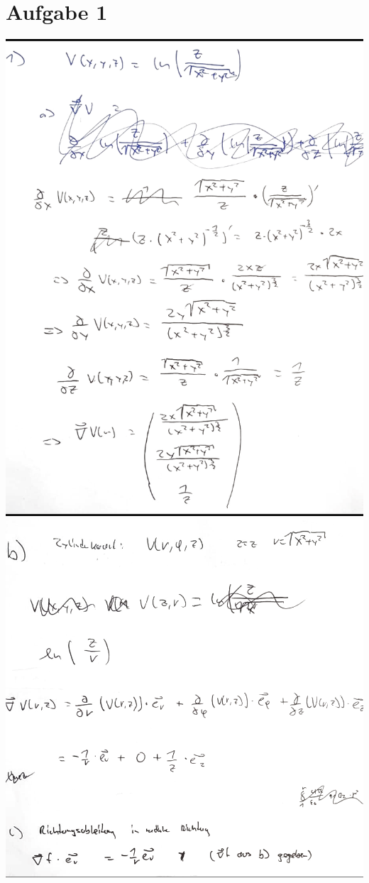 \documentclass{article}
\begin{document}
\section*{Aufgabe 1}
\thispagestyle{fancy}
\includegraphics[width=15cm]{aufgabe1a.png}
\newpage
\setlength{\headheight}{0cm}
\includegraphics[width=15cm]{aufgabe1b.png}
\newpage
\end{document}
